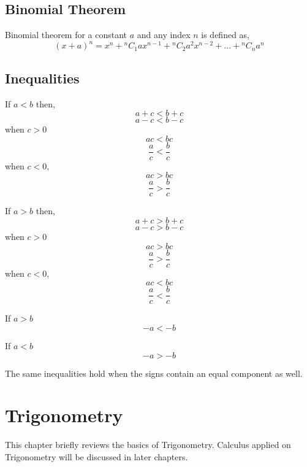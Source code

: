 \documentclass[a4paper]{book}
\begin{document}
\section{Binomial Theorem}
Binomial theorem for a constant $a$ and any index $n$ is defined as,
\begin{equation}
(x + a)^{n} = x^{n} + {}^{n}C_{1}ax^{n - 1} + {}^{n}C_{2}a^{2}x^{n - 2} + ... + {}^{n}C_{n}a^{n}
\end{equation}

\section{Inequalities}
\begin{description}
\item If $a < b$ then,
\begin{equation}
a + c < b + c
\end{equation}
\begin{equation}
a - c < b - c
\end{equation}
when $c > 0$
\begin{equation}
ac < bc
\end{equation}
\begin{equation}
\frac{a}{c} < \frac{b} {c}
\end{equation}
when $c < 0$,
\begin{equation}
ac > bc
\end{equation}
\begin{equation}
\frac{a}{c} > \frac{b} {c}
\end{equation}

\item If $a > b$ then,
\begin{equation}
a + c > b + c
\end{equation}
\begin{equation}
a - c > b - c
\end{equation}
when $c > 0$
\begin{equation}
ac > bc
\end{equation}
\begin{equation}
\frac{a}{c} > \frac{b} {c}
\end{equation}
when $c < 0$,
\begin{equation}
ac < bc
\end{equation}
\begin{equation}
\frac{a}{c} < \frac{b} {c}
\end{equation}
\item If $a > b$
\begin{equation}
-a < -b
\end{equation}
\item If $a < b$
\begin{equation}
-a > -b
\end{equation}
\end{description}
The same inequalities hold when the signs contain an equal component as well.


\chapter{Trigonometry}
This chapter briefly reviews the basics of Trigonometry. Calculus applied on Trigonometry will be discussed in later chapters.
\end{document}

